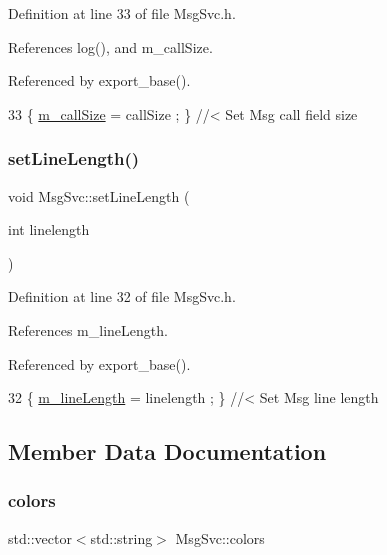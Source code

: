 Definition at line 33 of file Msg\+Svc.\+h.



References log(), and m\+\_\+call\+Size.



Referenced by export\+\_\+base().


\begin{DoxyCode}
33 \{ \hyperlink{classMsgSvc_ab22aa5d8130cbb94246c4192440d41fb}{m\_callSize}   = callSize  ; \} \textcolor{comment}{//< Set Msg call field size}
\end{DoxyCode}
\mbox{\label{classMsgSvc_ab741c391e80fcbf13eb2e60e48dc7536}} 
\subsubsection{\texorpdfstring{set\+Line\+Length()}{setLineLength()}}
{\footnotesize\ttfamily void Msg\+Svc\+::set\+Line\+Length (\begin{DoxyParamCaption}\item[{int}]{linelength }\end{DoxyParamCaption})\hspace{0.3cm}{\ttfamily [inline]}}



Definition at line 32 of file Msg\+Svc.\+h.



References m\+\_\+line\+Length.



Referenced by export\+\_\+base().


\begin{DoxyCode}
32 \{ \hyperlink{classMsgSvc_a63c500a8e8573e6e68e0c2966920ddaa}{m\_lineLength} = linelength ; \} \textcolor{comment}{//< Set Msg line length}
\end{DoxyCode}


\subsection{Member Data Documentation}
\mbox{\label{classMsgSvc_abcd0a0eab83f97f7638bbcca4f69e950}} 
\subsubsection{\texorpdfstring{colors}{colors}}
{\footnotesize\ttfamily std\+::vector$<$std\+::string$>$ Msg\+Svc\+::colors\hspace{0.3cm}{\ttfamily [private]}}



